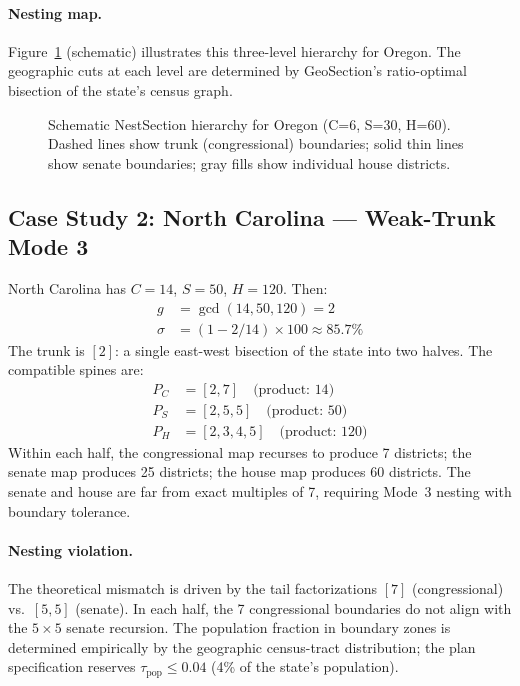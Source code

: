 \paragraph{Nesting map.} Figure~\ref{fig:or-nest} (schematic) illustrates this
three-level hierarchy for Oregon.  The geographic cuts at each level are
determined by GeoSection's ratio-optimal bisection of the state's census graph.

\begin{figure}[h]
\centering
{}
\caption{Schematic NestSection hierarchy for Oregon (C=6, S=30, H=60).
Dashed lines show trunk (congressional) boundaries; solid thin lines show
senate boundaries; gray fills show individual house districts.}
\label{fig:or-nest}
\end{figure}

\subsection{Case Study 2: North Carolina --- Weak-Trunk Mode 3}

North Carolina has $C = 14$, $S = 50$, $H = 120$.  Then:
\begin{align*}
  g &= \gcd(14, 50, 120) = 2 \\
  \sigma &= (1 - 2/14) \times 100 \approx 85.7\%
\end{align*}
The trunk is $[2]$: a single east-west bisection of the state into two halves.
The compatible spines are:
\begin{align*}
  P_C &= [2, 7] \quad \text{(product: }14\text{)} \\
  P_S &= [2, 5, 5] \quad \text{(product: }50\text{)} \\
  P_H &= [2, 3, 4, 5] \quad \text{(product: }120\text{)}
\end{align*}
Within each half, the congressional map recurses to produce 7 districts; the
senate map produces 25 districts; the house map produces 60 districts.  The
senate and house are far from exact multiples of 7, requiring Mode~3 nesting
with boundary tolerance.

\paragraph{Nesting violation.}  The theoretical mismatch is driven by the tail
factorizations $[7]$ (congressional) vs.\ $[5,5]$ (senate).  In each half,
the 7 congressional boundaries do not align with the $5 \times 5$ senate
recursion.  The population fraction in boundary zones is determined empirically
by the geographic census-tract distribution; the plan specification reserves
$\tau_\text{pop} \leq 0.04$ (4\% of the state's population).

